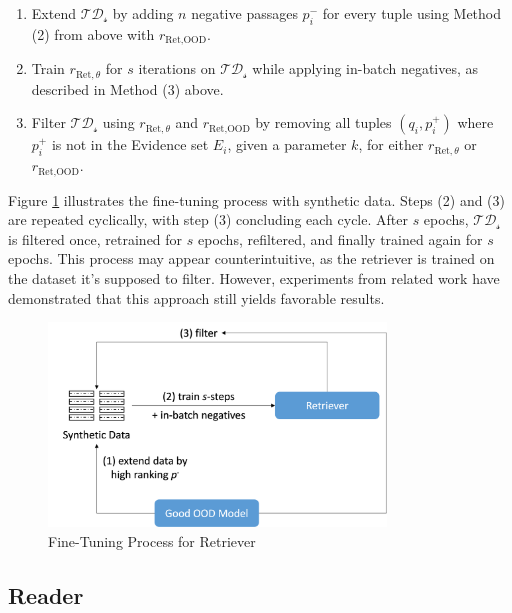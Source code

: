 \begin{enumerate}
    \item Extend $\mathcal{TD_s}$ by adding $n$ negative passages $p_i^-$ for every tuple using Method (2) from above with $r_{\text{Ret},\text{OOD}}$.
    \item Train $r_{\text{Ret}, \theta}$ for $s$ iterations on $\mathcal{TD_s}$ while applying in-batch negatives, as described in Method (3) above.
    \item Filter $\mathcal{TD_s}$ using $r_{\text{Ret}, \theta}$ and $r_{\text{Ret}, \text{OOD}}$ by removing all tuples $(q_i, p_i^+)$ where $p_i^+$ is not in the Evidence set $E_i$, given a parameter $k$, for either $r_{\text{Ret}, \theta}$ or $r_{\text{Ret}, \text{OOD}}$.
\end{enumerate}

Figure \ref{fig:retriever-fine-tuning} illustrates the fine-tuning process with synthetic data. Steps (2) and (3) are repeated cyclically, with step (3) concluding each cycle. After $s$ epochs, $\mathcal{TD_s}$ is filtered once, retrained for $s$ epochs, refiltered, and finally trained again for $s$ epochs. This process may appear counterintuitive, as the retriever is trained on the dataset it's supposed to filter. However, experiments from related work \cite{dai_promptagator_2022} have demonstrated that this approach still yields favorable results.


\begin{figure}
   \centering
    \includegraphics[width=0.8\textwidth]{Grafiken/Training.png}
    \caption{Fine-Tuning Process for Retriever}
    \label{fig:retriever-fine-tuning} 
\end{figure}




\subsection{Reader}
\label{subsec:reader}



